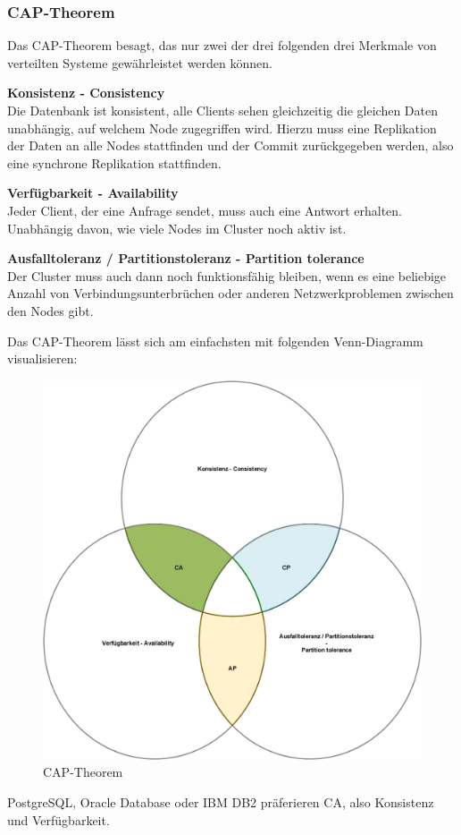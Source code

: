 
\subsubsection{CAP-Theorem}
Das CAP-Theorem besagt, das nur zwei der drei folgenden drei Merkmale von verteilten Systeme gewährleistet werden können\cite{EE6EQHU2}.
\begin{flushleft}
\textbf{Konsistenz - Consistency}\\
    Die Datenbank ist konsistent, alle Clients sehen gleichzeitig die gleichen Daten unabhängig, auf welchem Node zugegriffen wird.
    Hierzu muss eine Replikation der Daten an alle Nodes stattfinden und der Commit zurückgegeben werden, also eine synchrone Replikation stattfinden.
\end{flushleft}
\begin{flushleft}
\textbf{Verfügbarkeit - Availability}\\
    Jeder Client, der eine Anfrage sendet, muss auch eine Antwort erhalten.
    Unabhängig davon, wie viele Nodes im Cluster noch aktiv ist.
\end{flushleft}
\begin{flushleft}
\textbf{Ausfalltoleranz / Partitionstoleranz - Partition tolerance}\\
    Der Cluster muss auch dann noch funktionsfähig bleiben, wenn es eine beliebige Anzahl von Verbindungsunterbrüchen oder anderen Netzwerkproblemen zwischen den Nodes gibt.
\end{flushleft}
\begin{flushleft}
    Das CAP-Theorem lässt sich am einfachsten mit folgenden Venn-Diagramm visualisieren:
    \begin{figure}[H]
        \centering
        \includegraphics[width=0.5\linewidth]{source/implementation/evaluation/excursus_architecture/cap_theorem}
        \caption{CAP-Theorem}
        \label{fig:cap_theorem}
    \end{figure}
    \Gls{PostgreSQL}, \Gls{Oracle Database} oder \Gls{IBM DB2} präferieren CA, also Konsistenz und Verfügbarkeit.
\end{flushleft}